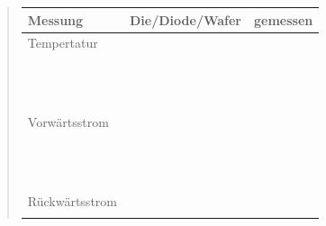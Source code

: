 \begin{quote}
      \begin{table}[h]
                 \begin{addmargin}[-1cm]{3cm}
     \centering
                     \begin{tabular}{|p{3cm}|p{3cm}|p{10.2cm}|}
         \hline
         Messung & Die/Diode/Wafer & gemessen\\
         \hline
         Tempertatur & & \\
                                 & & \\
                                 & & \\
                                 & & \\
                                 & & \\
                                 & & \\
                                 & & \\
                                 & & \\
                                 & & \\
                                 & & \\
                                 & & \\
                                 & & \\
                                 & & \\
         \hline
         Vorwärtsstrom & & \\
                                 & & \\
                                 & & \\
                                 & & \\
                                 & & \\
                                 & & \\
                                 & & \\
                                 & & \\
                                 & & \\
                                 & & \\
                                 & & \\
                                 & & \\
                                 & & \\
         \hline
         Rückwärtsstrom & &\\
                                 & & \\

\end{tabular}
\end{addmargin}
\end{table}
\end{quote}
